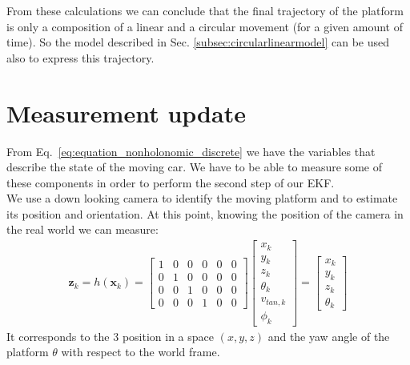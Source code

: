 From these calculations we can conclude that the final trajectory of the platform is only a composition of a linear and a circular movement (for a given amount of time). So the model described in Sec. \ref{subsec:circularlinearmodel} can be used also to express this trajectory.

\section{Measurement update}
From Eq.~\eqref{eq:equation_nonholonomic_discrete} we have the variables that describe the state of the moving car. We have to be able to measure some of these components in order to perform the second step of our EKF. \\
We use a down looking camera to identify the moving platform and to estimate its position and orientation. At this point, knowing the position of the camera in the real world we can measure:
\begin{align}
\boldsymbol{z}_k = h(\boldsymbol{x}_k) =
\begin{bmatrix}
1 & 0 & 0 & 0 & 0 & 0 \\[10pt]
0 & 1 & 0 & 0 & 0 & 0  \\[10pt]
0 & 0 & 1 & 0 & 0 & 0 \\[10pt]
0 & 0 & 0 & 1 & 0 & 0
\end{bmatrix} 
\begin{bmatrix}
x_k \\[5pt]
y_k  \\[5pt]
z_k \\[5pt]
\theta_k \\[5pt]
v_{tan,k} \\[5pt]
\phi_k
\end{bmatrix} = \begin{bmatrix}
x_k  \\[10pt]
y_k  \\[10pt]
z_k \\[10pt]
\theta_k
\end{bmatrix}
\label{eq:realmeasure}
\end{align}
It corresponds to the 3 position in a space $(x,y,z)$ and the yaw angle of the platform $\theta$ with respect to the world frame.

